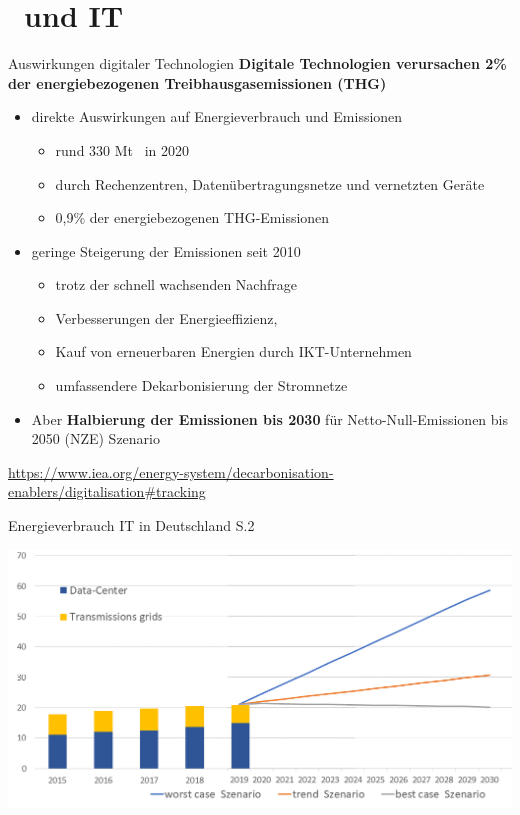 \section{\COz \ und  IT}

\begin{frame}{Auswirkungen digitaler Technologien}
%
\textbf{Digitale Technologien verursachen 2\% \hspace*{\fill}
                      der energiebezogenen Treibhausgasemissionen (THG)}
		\begin{itemize}
				\item direkte Auswirkungen auf Energieverbrauch und Emissionen
					\begin{itemize}
						\item rund 330 Mt \COze \ in 2020 
						\item durch Rechenzentren, Datenübertragungsnetze und vernetzten Geräte 
						\item 0,9\% der energiebezogenen THG-Emissionen  
				 \end{itemize}
			\pause
			\item geringe Steigerung der Emissionen seit 2010
				\begin{itemize}
					\item trotz der schnell wachsenden Nachfrage   
					\item Verbesserungen der Energieeffizienz, 
					\item Kauf von erneuerbaren Energien durch IKT-Unternehmen 
					\item umfassendere Dekarbonisierung der Stromnetze 
				\end{itemize}
				\pause 
			\item Aber \textbf<4->{Halbierung der Emissionen bis 2030}  für  Netto-Null-Emissionen bis 2050 (NZE) Szenario 
		\end{itemize}
		
\href{https://www.iea.org/energy-system/decarbonisation-enablers/digitalisation\#tracking}{\tiny https://www.iea.org/energy-system/decarbonisation-enablers/digitalisation\#tracking}

\end{frame}

\begin{frame}{Energieverbrauch IT in Deutschland  \cite{grunwald_energy_2022} S.2}
	\begin{center}
	     \includegraphics[width=.8\textwidth]{../Figures/fignachTAB22.png}
			
	\end{center}

\end{frame}

